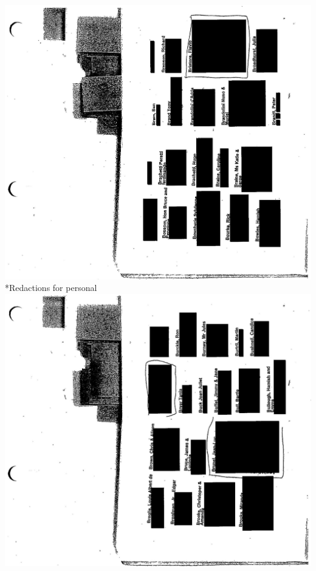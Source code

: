 \documentclass[10pt]{article}
\begin{document}
\includegraphics[max width=\textwidth, center]{2025_02_27_dd68c3d38de88f0516d9g-129}\\
*Redactions for personal\\
\includegraphics[max width=\textwidth, center]{2025_02_27_dd68c3d38de88f0516d9g-130}\\
\end{document}
